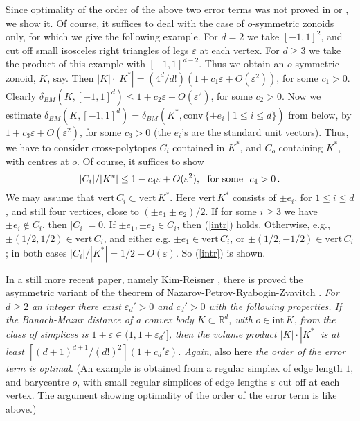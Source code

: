 \documentclass[12pt]{article}
\begin{document}
Since optimality of the order of the
above two error terms was not proved in \cite{NPRZ} or \cite{BH}, 
we show it. Of course, it suffices to deal with the case of $o$-symmetric
zonoids only, for which we give the following example.
For $d=2$ we take $[-1,1]^2$, and cut off small isosceles right triangles of
legs $\varepsilon $ at each vertex. 
For $d \ge 3$ we take the product of this example with
$[-1,1]^{d-2}$. Thus we obtain an $o$-symmetric zonoid, $K$, say. 
Then $| K | \cdot | K^* | =
(4^d/d!)\left( 1+ c_1 \varepsilon +O(\varepsilon ^2) \right) $, 
for some $c_1>0$. 
Clearly $\delta _{BM}(K,[-1,1]^d) \le 
1+ c_2 \varepsilon +O(\varepsilon ^2)$, for some $c_2>0$. 
Now we estimate $\delta _{BM}(K,[-1,1]^d) =
\delta _{BM} \left( K^*, {\text{conv}} \, \{ \pm e_i 
\mid 1 \le i \le d \} \right) $
from below, by $1+ c_3 \varepsilon +O(\varepsilon ^2)$, for some $c_3>0$
(the $e_i$'s are the standard unit vectors). 
Thus, we have to consider cross-polytopes $C_i$ contained in $K^*$, and
$C_o$ containing $K^*$, with centres at $o$. 
Of course, it suffices to show 
\begin{equation}
\label{intr}
|C_i|/|K^*| \le 1-c_4 \varepsilon +O(\varepsilon ^2), 
{\text{\,\,\,\,for some\,\,\,\,}}
c_4>0\,.
\end{equation}
We may assume that ${\text{vert}}\,C_i \subset {\text{vert}}\,K^*$.
Here ${\text{vert}}\,K^*$ consists of $\pm e_i$, for $1 \le i \le d$,
and still four vertices, close to $(\pm e_1 \pm e_2)/2$.
If for some $i \ge 3$ we have $\pm e_i \not\in C_i$, then $|C_i|=0$.
If $\pm e_1, \pm e_2 \in C_i$, then (\ref{intr}) holds. Otherwise, e.g., 
$\pm (1/2,1/2) \in {\text{vert}}\,C_i$, and either e.g.
$\pm e_1 \in {\text{vert}}
\,C_i$, or $\pm (1/2,-1/2)\in {\text{vert}}\,C_i$; in both cases $|C_i|/|K^*|=
1/2+ O( \varepsilon )$. So (\ref{intr}) is shown.

In a still more recent paper, namely Kim-Reisner \cite{KR}, there is 
proved the asymmetric variant of the theorem of
Nazarov-Petrov-Ryabogin-Zvavitch \cite{NPRZ}.
{\it{For $d \ge 2$ an integer there exist
$\varepsilon _d' >0$ and $c_d'>0$ with the following properties. 
If the Banach-Mazur distance of a convex body $K \subset {\mathbb{R}}^d$,
with}} $o \in {\text{int}}\,K$, {\it{from the class of
simplices is $1+ \varepsilon  \in (1, 1+ \varepsilon _d']$, 
then the volume product
$|K| \cdot |K^*|$ is at least $[(d+1)^{d+1}/(d!)^2](1+c_d' \varepsilon )$.
Again}}, also here {\it{the order of the error term is optimal}}. 
(An example is
obtained from a regular simplex of edge length $1$, and barycentre $o$, with 
small regular simplices of edge lengths $\varepsilon $ cut off at each
vertex. The argument showing optimality of the order of the error term
is like above.)
\end{document}
